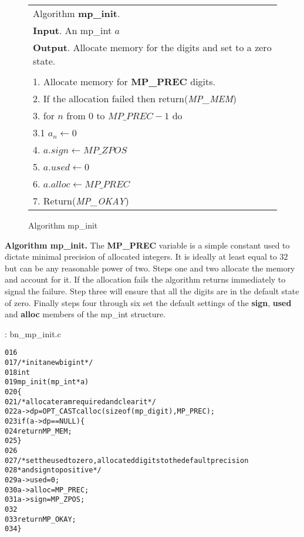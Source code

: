 \documentclass[b5paper]{book}
\begin{document}
\begin{figure}[here]
\begin{center}
\begin{tabular}{l}
\hline Algorithm \textbf{mp\_init}. \\
\textbf{Input}.   An mp\_int $a$ \\
\textbf{Output}.  Allocate memory for the digits and set to a zero state. \\
\hline \\
1.  Allocate memory for \textbf{MP\_PREC} digits. \\
2.  If the allocation failed then return(\textit{MP\_MEM}) \\
3.  for $n$ from $0$ to $MP\_PREC - 1$ do  \\
\hspace{3mm}3.1  $a_n \leftarrow 0$\\
4.  $a.sign \leftarrow MP\_ZPOS$\\
5.  $a.used \leftarrow 0$\\
6.  $a.alloc \leftarrow MP\_PREC$\\
7.  Return(\textit{MP\_OKAY})\\
\hline
\end{tabular}
\end{center}
\caption{Algorithm mp\_init}
\end{figure}

\textbf{Algorithm mp\_init.}
The \textbf{MP\_PREC} variable is a simple constant used to dictate minimal precision of allocated integers.  It is ideally at least equal to $32$ but 
can be any reasonable power of two.  Steps one and two allocate the memory and account for it.  If the allocation fails the algorithm returns
immediately to signal the failure.  Step three will ensure that all the digits are in the default state of zero.  Finally steps 
four through six set the default settings of the \textbf{sign}, \textbf{used} and \textbf{alloc} members of the mp\_int structure.

\vspace{+3mm}\begin{small}
\hspace{-5.1mm}{\bf File}: bn\_mp\_init.c
\vspace{-3mm}
\begin{alltt}
016   
017   /* init a new bigint */
018   int
019   mp_init (mp_int * a)
020   \{
021     /* allocate ram required and clear it */
022     a->dp = OPT_CAST calloc (sizeof (mp_digit), MP_PREC);
023     if (a->dp == NULL) \{
024       return MP_MEM;
025     \}
026   
027     /* set the used to zero, allocated digits to the default precision
028      * and sign to positive */
029     a->used  = 0;
030     a->alloc = MP_PREC;
031     a->sign  = MP_ZPOS;
032   
033     return MP_OKAY;
034   \}
\end{alltt}
\end{small}
\end{document}
